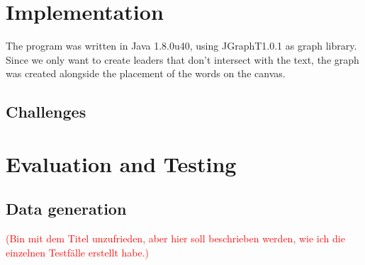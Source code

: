 \documentclass[11pt,a4paper]{vutinfth}
\newcommand{\change}[1]{\textcolor{red}{#1}}
\begin{document}
\chapter{Implementation}
The program was written in Java 1.8.0u40, using JGraphT1.0.1\cite{JGraphT} as graph library. Since we only want to create leaders that don't intersect with the text, the graph was created alongside the placement of the words on the canvas.%
\section{Challenges}







\chapter{Evaluation and Testing}

\section{Data generation} \change{(Bin mit dem Titel unzufrieden, aber hier soll beschrieben werden, wie ich die einzelnen Testfälle erstellt habe.)}
\end{document}
